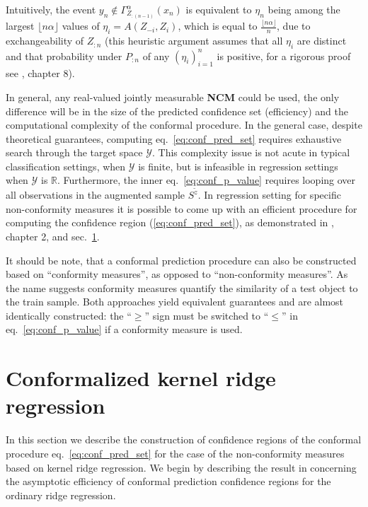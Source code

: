 \documentclass[a4paper,14pt]{extarticle}
\newcommand{\Ycal}{\mathcal{Y}}
\newcommand{\Real}{\mathbb{R}}
\begin{document}
Intuitively, the event $y_n \notin \Gamma^\alpha_{Z_{:(n-1)}}(x_n)$ is equivalent
to $\eta_n$ being among the largest $\lfloor n\alpha\rfloor$ values of $\eta_i = A(Z_{-i}, Z_i)$,
which is equal to $\frac{\lfloor n\alpha\rfloor}{n}$, due to exchangeability of
$Z_{:n}$ (this heuristic argument assumes that all $\eta_i$ are distinct and that
probability under $P_{:n}$ of any $(\eta_i)_{i=1}^n$ is positive, for a rigorous
proof see \cite{vovk2005}, chapter 8).

In general, any real-valued jointly measurable \textbf{NCM} could be used, the only
difference will be in the size of the predicted confidence set (efficiency) and the
computational complexity of the conformal procedure. In the general case, despite
theoretical guarantees, computing eq.~\ref{eq:conf_pred_set} requires exhaustive
search through the target space $\Ycal$. This complexity issue is not acute in typical
classification settings, when $\Ycal$ is finite, but is infeasible in regression
settings when $\Ycal$ is $\Real$. Furthermore, the inner eq.~\ref{eq:conf_p_value}
requires looping over all observations in the augmented sample $S^{\tilde{z}}$.
In regression setting for specific non-conformity measures it is possible to come
up with an efficient procedure for computing the confidence region (\ref{eq:conf_pred_set}),
as demonstrated in \cite{vovk2005}, chapter 2, and sec.~\ref{sec:conformalized_krr}.

It should be note, that a conformal prediction procedure can also be constructed
based on ``conformity measures'', as opposed to ``non-conformity measures''. As
the name suggests conformity measures quantify the similarity of a test object to
the train sample. Both approaches yield equivalent guarantees and are almost identically
constructed: the ``$\geq$'' sign must be switched to ``$\leq$'' in eq.~\ref{eq:conf_p_value}
if a conformity measure is used.


\section{Conformalized kernel ridge regression} %
\label{sec:conformalized_krr}

In this section we describe the construction of confidence regions of the conformal
procedure eq.~\ref{eq:conf_pred_set} for the case of the non-conformity measures
based on kernel ridge regression. We begin by describing the result in \cite{burnaevV14}
concerning the asymptotic efficiency of conformal prediction confidence regions
for the ordinary ridge regression.
\end{document}
